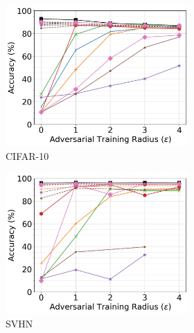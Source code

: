 \documentclass[conference]{IEEEtran}
\theoremstyle{definition}
\theoremstyle{remark}
\theoremstyle{proposition}
\begin{document}
\begin{figure}[p!]
\begin{subfigure}{1.0\textwidth}
	\begin{subfigure}{.3\textwidth}
		\centering
		\includegraphics[width=1.0\textwidth]{VGG-16_AT_CIFAR-10.jpg}
		\caption*{CIFAR-10}
		\label{fig:at_cifar10:vgg16}
	\end{subfigure}\hspace*{0.75em}
	\begin{subfigure}{.3\textwidth}
		\centering
		\includegraphics[width=1.0\textwidth]{VGG-16_AT_SVHN.jpg}
		\caption*{SVHN}
		\label{fig:at_svhn:vgg16}
	\end{subfigure}\hspace*{0.75em}
	\begin{subfigure}{.3\textwidth}

\end{subfigure}
\end{subfigure}
\end{figure}
\end{document}
